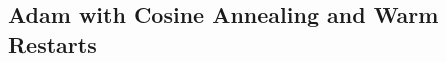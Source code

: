 \documentclass[usenames,dvipsnames]{article} %
\begin{document}
\subsection{Adam with Cosine Annealing and Warm Restarts}
\label{sec:adamwr}


\end{document}
